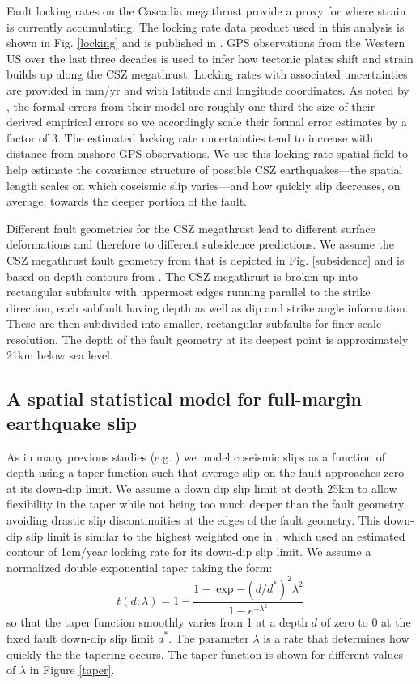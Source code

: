 {Fault locking rates on the Cascadia megathrust provide a proxy for where strain is currently accumulating.  The locking rate data product used in this analysis is shown in Fig. \ref{locking} and is published in \citet{pollitz2017}.  GPS observations from the Western US over the last three decades is used to infer how tectonic plates shift and strain builds up along the CSZ megathrust.  Locking rates with associated uncertainties are provided in mm/yr and with latitude and longitude coordinates.  As noted by \citet{pollitz2017}, the formal errors from their model are roughly one third the size of their derived empirical errors so we accordingly scale their formal error estimates by a factor of 3.  The estimated locking rate uncertainties tend to increase with distance from onshore GPS observations.  We use this locking rate spatial field to help estimate the covariance structure of possible CSZ earthquakes---the spatial length scales on which coseismic slip varies---and how quickly slip decreases, on average, towards the deeper portion of the fault.

Different fault geometries for the CSZ megathrust lead to different surface deformations and therefore to different subsidence predictions.  We assume the CSZ megathrust fault geometry from \citet{faultGeom} that is depicted in Fig. \ref{subsidence} and is based on depth contours from \citet{faultGeom2}.  The CSZ megathrust is broken up into rectangular subfaults with uppermost edges running parallel to the strike direction, each subfault having depth as well as dip and strike angle information.  These are then subdivided into smaller, rectangular subfaults for finer scale resolution.  The depth of the fault geometry at its deepest point is approximately 21km below sea level.

\subsection{A spatial statistical model for full-margin earthquake slip}
\label{model}
As in many previous studies (e.g. \citet{leonard2010, leveque2016, melgar2016}) we model coseismic slips as a function of depth using a taper function such that average slip on the fault approaches zero at its down-dip limit. We assume a down dip slip limit at depth 25km to allow flexibility in the taper while not being too much deeper than the fault geometry, avoiding drastic slip discontinuities at the edges of the fault geometry.  This down-dip slip limit is similar to the highest weighted one in \citet[p. 98-99]{hazardMaps2014}, which used an estimated contour of 1cm/year locking rate for its down-dip slip limit.  We assume a normalized double exponential taper taking the form:
\begin{equation}
t(d; \lambda) = 1 - \dfrac{1 - \exp{-(d/d^*)^2 \lambda^2}}{1 - e^{-\lambda^2}} \label{taperDef} 
\end{equation}
so that the taper function smoothly varies from 1 at a depth $d$ of zero to 0 at the fixed fault down-dip slip limit $d^*$.  The parameter $\lambda$ is a rate that determines how quickly the the tapering occurs.  The taper function is shown for different values of $\lambda$ in Figure \ref{taper}.

}
